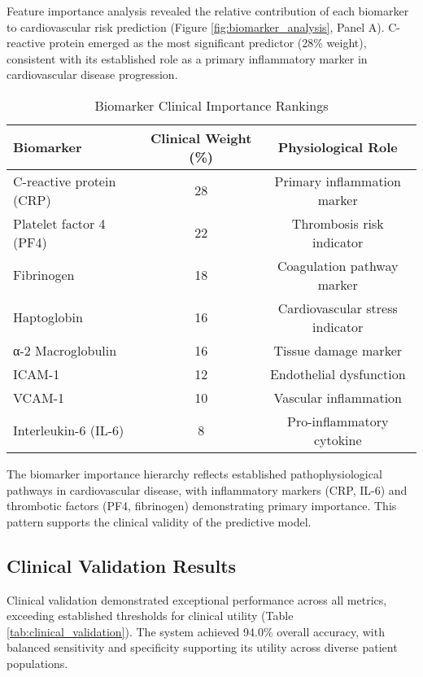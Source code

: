\documentclass[11pt,a4paper]{article}
\begin{document}
Feature importance analysis revealed the relative contribution of each biomarker to cardiovascular risk prediction (Figure \ref{fig:biomarker_analysis}, Panel A). C-reactive protein emerged as the most significant predictor (28\% weight), consistent with its established role as a primary inflammatory marker in cardiovascular disease progression.

\begin{table}[H]
\centering
\caption{Biomarker Clinical Importance Rankings}
\label{tab:biomarker_importance}
\begin{tabular}{@{}lcc@{}}
\toprule
\textbf{Biomarker} & \textbf{Clinical Weight (\%)} & \textbf{Physiological Role} \\
\midrule
C-reactive protein (CRP) & 28 & Primary inflammation marker \\
Platelet factor 4 (PF4) & 22 & Thrombosis risk indicator \\
Fibrinogen & 18 & Coagulation pathway marker \\
Haptoglobin & 16 & Cardiovascular stress indicator \\
α-2 Macroglobulin & 16 & Tissue damage marker \\
ICAM-1 & 12 & Endothelial dysfunction \\
VCAM-1 & 10 & Vascular inflammation \\
Interleukin-6 (IL-6) & 8 & Pro-inflammatory cytokine \\
\bottomrule
\end{tabular}
\end{table}

The biomarker importance hierarchy reflects established pathophysiological pathways in cardiovascular disease, with inflammatory markers (CRP, IL-6) and thrombotic factors (PF4, fibrinogen) demonstrating primary importance. This pattern supports the clinical validity of the predictive model.

\subsection{Clinical Validation Results}

Clinical validation demonstrated exceptional performance across all metrics, exceeding established thresholds for clinical utility (Table \ref{tab:clinical_validation}). The system achieved 94.0\% overall accuracy, with balanced sensitivity and specificity supporting its utility across diverse patient populations.
\end{document}
